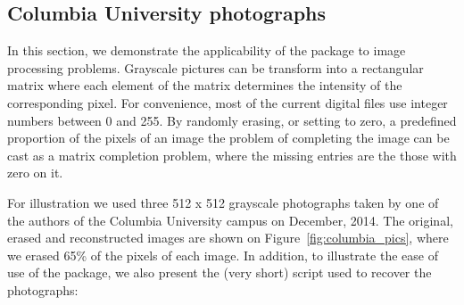 \documentclass[12pt]{article}
\begin{document}
\begin{table}[h]
\centering
{}
\caption{RMSE vs Step Size vs Rank}
\end{table}

\clearpage
\subsection*{Columbia University photographs}
In this section, we demonstrate the applicability of the package to image processing problems. Grayscale pictures can be transform into a rectangular matrix where each element of the matrix determines the intensity of the corresponding pixel. For convenience, most of the current digital files use integer numbers between 0 and 255. By randomly erasing, or setting to zero, a predefined proportion of the pixels of an image the problem of completing the image can be cast as a matrix completion problem, where the missing entries are the those with zero on it. 

For illustration we used three  512 x 512 grayscale photographs taken by one of the authors of the Columbia University campus on December, 2014. The original, erased and reconstructed images are shown on Figure~\ref{fig:columbia_pics}, where we erased 65\% of the pixels of each image.  In addition, to illustrate the ease of use of the package, we also present the (very short) script used to recover the photographs:
\end{document}
